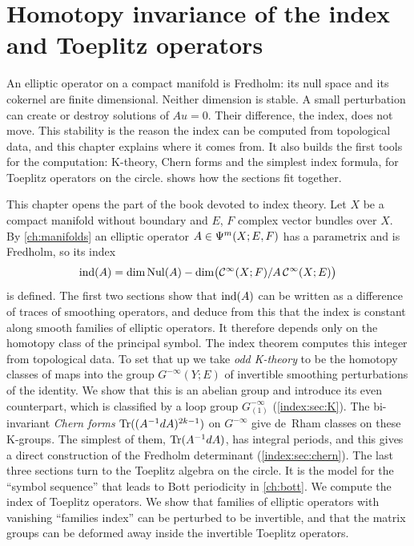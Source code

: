 \chapter{Homotopy invariance of the index and Toeplitz operators}\label{ch:index}
\providecommand{\Ginf}{G^{-\infty}}
\providecommand{\Gloop}{G^{-\infty}_{(1)}}
\providecommand{\PsiT}[1]{\Psi^{#1}_{\mathcal T}}
\providecommand{\Hardy}{\mathcal{C}^\infty_{+}}
\providecommand{\Hardym}{\mathcal{C}^\infty_{-}}
\providecommand{\wind}{\operatorname{wind}}
\providecommand{\Iso}{\operatorname{Iso}}

An elliptic operator on a compact manifold is Fredholm: its null space and its
cokernel are finite dimensional. Neither dimension is stable. A small
perturbation can create or destroy solutions of $Au=0$. Their difference, the
index, does not move. This stability is the reason the index can be computed
from topological data, and this chapter explains where it comes from. It also
builds the first tools for the computation: K-theory, Chern forms and the
simplest index formula, for Toeplitz operators on the circle.
 shows how the sections fit together.

This chapter opens the part of the book devoted to index theory. Let $X$ be a
compact manifold without boundary and $E$, $F$ complex vector bundles over $X$.
By \cref{ch:manifolds} an elliptic operator $A\in\Psi^{m}(X;E,F)$ has a
parametrix and is Fredholm, so its index
\begin{equation*}
  \operatorname{ind}(A)=\dim\operatorname{Nul}(A)-\dim\bigl(\mathcal{C}^\infty(X;F)/A\,\mathcal{C}^\infty(X;E)\bigr)
\end{equation*}
is defined. The first two sections show that $\operatorname{ind}(A)$ can be written as a
difference of traces of smoothing operators, and deduce from this that the
index is constant along smooth families of elliptic operators. It therefore
depends only on the homotopy class of the principal symbol. The index theorem
computes this integer from topological data. To set that up we take
\emph{odd K-theory} to be the homotopy classes of maps into the group
$\Ginf(Y;E)$ of invertible smoothing perturbations of the identity. We show that
this is an abelian group and introduce its even counterpart, which is
classified by a loop group $\Gloop$ (\cref{index:sec:K}). The bi-invariant
\emph{Chern forms} $\operatorname{Tr}((A^{-1}dA)^{2k-1})$ on $\Ginf$ give de~Rham classes on
these K-groups. The simplest of them, $\operatorname{Tr}(A^{-1}dA)$, has integral periods,
and this gives a direct construction of the Fredholm determinant
(\cref{index:sec:chern}). The last three sections turn to the Toeplitz algebra
on the circle. It is the model for the ``symbol sequence'' that leads to Bott
periodicity in \cref{ch:bott}. We compute the index of Toeplitz operators. We
show that families of elliptic operators with vanishing ``families index'' can
be perturbed to be invertible, and that the matrix groups can be deformed away
inside the invertible Toeplitz operators.

